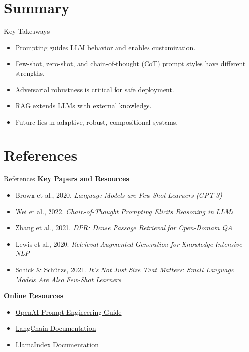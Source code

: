 \section{Summary}
\begin{frame}{Key Takeaways}
    \begin{itemize}
        \setlength{\itemsep}{1em}
        \item Prompting guides LLM behavior and enables customization.
        \item Few-shot, zero-shot, and chain-of-thought (CoT) prompt styles have different strengths.
        \item Adversarial robustness is critical for safe deployment.
        \item RAG extends LLMs with external knowledge.
        \item Future lies in adaptive, robust, compositional systems.
    \end{itemize}
\end{frame}


\section{References}
\begin{frame}{References}
    \textbf{Key Papers and Resources}
    \begin{itemize}
        \item Brown et al., 2020. \textit{Language Models are Few-Shot Learners (GPT-3)}
        \item Wei et al., 2022. \textit{Chain-of-Thought Prompting Elicits Reasoning in LLMs}
        \item Zhang et al., 2021. \textit{DPR: Dense Passage Retrieval for Open-Domain QA}
        \item Lewis et al., 2020. \textit{Retrieval-Augmented Generation for Knowledge-Intensive NLP}
        \item Schick \& Schütze, 2021. \textit{It's Not Just Size That Matters: Small Language Models Are Also Few-Shot Learners}
    \end{itemize}
    \vspace{0.5em}
    \textbf{Online Resources}
    \begin{itemize}
        \item \href{https://platform.openai.com/docs/guides/prompting}{OpenAI Prompt Engineering Guide}
        \item \href{https://docs.langchain.com}{LangChain Documentation}
        \item \href{https://www.llamaindex.ai}{LlamaIndex Documentation}
    \end{itemize}
\end{frame}